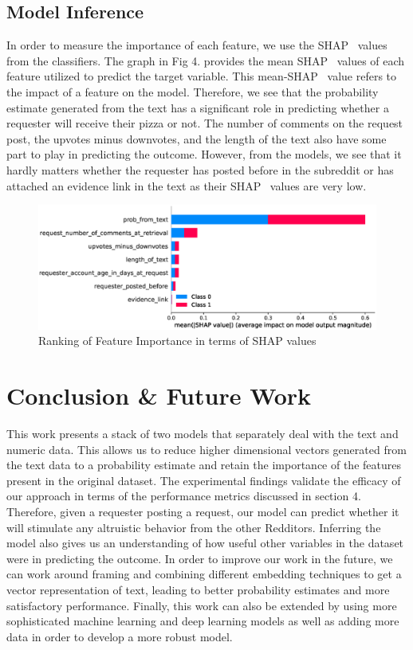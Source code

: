 \documentclass[conference]{IEEEtran}
\begin{document}
\subsection{Model Inference}
In order to measure the importance of each feature, we use the SHAP~\cite{shap} values from the classifiers. The graph in Fig 4. provides the mean SHAP~\cite{shap} values of each feature utilized to predict the target variable. This mean-SHAP~\cite{shap} value refers to the impact of a feature on the model. Therefore, we see that the probability estimate generated from the text has a significant role in predicting whether a requester will receive their pizza or not. The number of comments on the request post, the upvotes minus downvotes, and the length of the text also have some part to play in predicting the outcome. However, from the models, we see that it hardly matters whether the requester has posted before in the subreddit or has attached an evidence link in the text as their SHAP~\cite{shap} values are very low.
\begin{figure}
\includegraphics[width=\linewidth]{FeatureImportanceShapley_minmax.eps}
\caption{Ranking of Feature Importance in terms of SHAP values} \label{fig4}
\end{figure}

\section{Conclusion \& Future Work}
This work presents a stack of two models that separately deal with the text and numeric data. This allows us to reduce higher dimensional vectors generated from the text data to a probability estimate and retain the importance of the features present in the original dataset. The experimental findings validate the efficacy of our approach in terms of the performance metrics discussed in section 4. Therefore, given a requester posting a request, our model can predict whether it will stimulate any altruistic behavior from the other Redditors. Inferring the model also gives us an understanding of how useful other variables in the dataset were in predicting the outcome. In order to improve our work in the future, we can work around framing and combining different embedding techniques to get a vector representation of text, leading to better probability estimates and more satisfactory performance. Finally, this work can also be extended by using more sophisticated machine learning and deep learning models as well as adding more data in order to develop a more robust model.
\end{document}
